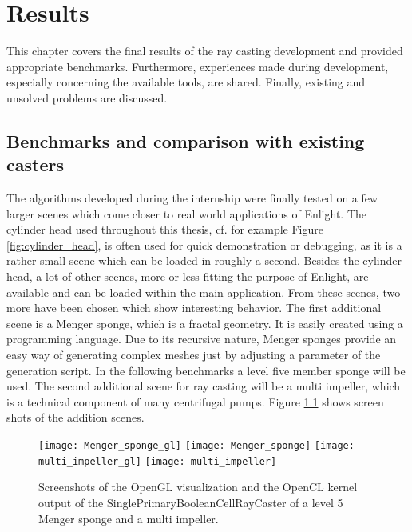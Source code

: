 \chapter{Results}
\label{sec:results}

This chapter covers the final results of the ray casting development and provided appropriate benchmarks. Furthermore, experiences made during development, especially concerning the available tools, are shared. Finally, existing and unsolved problems are discussed.

\section{Benchmarks and comparison with existing casters}

The algorithms developed during the internship were finally tested on a few larger scenes which come closer to real world applications of Enlight. The cylinder head used throughout this thesis, cf. for example Figure \ref{fig:cylinder_head}, is often used for quick demonstration or debugging, as it is a rather small scene which can be loaded in roughly a second. Besides the cylinder head, a lot of other scenes, more or less fitting the purpose of Enlight, are available and can be loaded within the main application. From these scenes, two more have been chosen which show interesting behavior. The first additional scene is a Menger sponge, which is a fractal geometry. It is easily created using a programming language. Due to its recursive nature, Menger sponges provide an easy way of generating complex meshes just by adjusting a parameter of the generation script. In the following benchmarks a level five member sponge will be used. The second additional scene for ray casting will be a multi impeller, which is a technical component of many centrifugal pumps. Figure \ref{fig:Menger_sponge_multi_impeller} shows screen shots of the addition scenes.

\begin{figure}[h]
\centering
\texttt{[image: Menger\_sponge\_gl]}
\texttt{[image: Menger\_sponge]}
\texttt{[image: multi\_impeller\_gl]}
\texttt{[image: multi\_impeller]}
\caption{Screenshots of the OpenGL visualization and the OpenCL kernel output of the SinglePrimaryBooleanCellRayCaster of a level 5 Menger sponge and a multi impeller.}
\label{fig:Menger_sponge_multi_impeller}
\end{figure}

